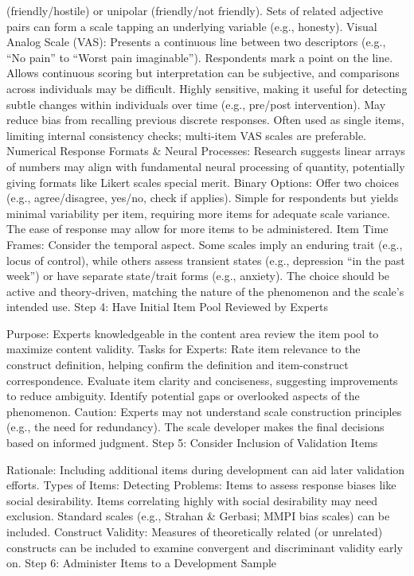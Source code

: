\documentclass[
]{article}
\begin{document}
(friendly/hostile) or unipolar (friendly/not friendly). Sets of related
adjective pairs can form a scale tapping an underlying variable (e.g.,
honesty). Visual Analog Scale (VAS): Presents a continuous line between
two descriptors (e.g., ``No pain'' to ``Worst pain imaginable'').
Respondents mark a point on the line. Allows continuous scoring but
interpretation can be subjective, and comparisons across individuals may
be difficult. Highly sensitive, making it useful for detecting subtle
changes within individuals over time (e.g., pre/post intervention). May
reduce bias from recalling previous discrete responses. Often used as
single items, limiting internal consistency checks; multi-item VAS
scales are preferable. Numerical Response Formats \& Neural Processes:
Research suggests linear arrays of numbers may align with fundamental
neural processing of quantity, potentially giving formats like Likert
scales special merit. Binary Options: Offer two choices (e.g.,
agree/disagree, yes/no, check if applies). Simple for respondents but
yields minimal variability per item, requiring more items for adequate
scale variance. The ease of response may allow for more items to be
administered. Item Time Frames: Consider the temporal aspect. Some
scales imply an enduring trait (e.g., locus of control), while others
assess transient states (e.g., depression ``in the past week'') or have
separate state/trait forms (e.g., anxiety). The choice should be active
and theory-driven, matching the nature of the phenomenon and the scale's
intended use. Step 4: Have Initial Item Pool Reviewed by Experts

Purpose: Experts knowledgeable in the content area review the item pool
to maximize content validity. Tasks for Experts: Rate item relevance to
the construct definition, helping confirm the definition and
item-construct correspondence. Evaluate item clarity and conciseness,
suggesting improvements to reduce ambiguity. Identify potential gaps or
overlooked aspects of the phenomenon. Caution: Experts may not
understand scale construction principles (e.g., the need for
redundancy). The scale developer makes the final decisions based on
informed judgment. Step 5: Consider Inclusion of Validation Items

Rationale: Including additional items during development can aid later
validation efforts. Types of Items: Detecting Problems: Items to assess
response biases like social desirability. Items correlating highly with
social desirability may need exclusion. Standard scales (e.g., Strahan
\& Gerbasi; MMPI bias scales) can be included. Construct Validity:
Measures of theoretically related (or unrelated) constructs can be
included to examine convergent and discriminant validity early on. Step
6: Administer Items to a Development Sample
\end{document}
